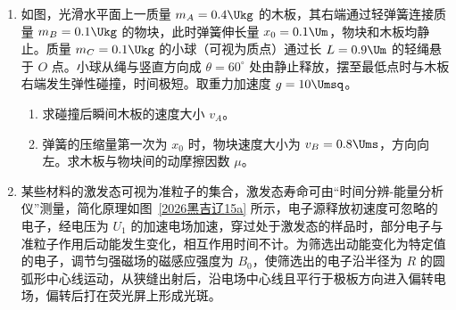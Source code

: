 \documentclass[\gkver]{gaokaozhenti}
\begin{document}
\begin{enumerate}
{（2）减速阶段，由动量定理得
\[ -\left(mg-\frac{1}{6}mg\right)t=0-mv_{m} \]
解得 $t=3\Us$。
}
\item
如图，光滑水平面上一质量 $m_{A}=0.4\Ukg$ 的木板，其右端通过轻弹簧连接质量 $m_{B}=0.1\Ukg$ 的物块，此时弹簧伸长量 $x_{0}=0.1\Um$，物块和木板均静止。质量 $m_{C}=0.1\Ukg$ 的小球（可视为质点）通过长 $L=0.9\Um$ 的轻绳悬于 $O$ 点。小球从绳与竖直方向成 $\theta=60^{\circ}$ 处由静止释放，摆至最低点时与木板右端发生弹性碰撞，时间极短。取重力加速度 $g=10\Umsq$。
\begin{enumerate}
	\item
	求碰撞后瞬间木板的速度大小 $v_{A}$。
	\item
	弹簧的压缩量第一次为 $x_{0}$ 时，物块速度大小为 $v_{B}=0.8\Ums$，方向向左。求木板与物块间的动摩擦因数 $\mu$。
\end{enumerate}
\onepicture[w=8.5cm, align=right]{}

\item
某些材料的激发态可视为准粒子的集合，激发态寿命可由“时间分辨-能量分析仪”测量，简化原理如图~\ref{2026黑吉辽15a} 所示，电子源释放初速度可忽略的电子，经电压为 $U_{1}$ 的加速电场加速，穿过处于激发态的样品时，部分电子与准粒子作用后动能发生变化，相互作用时间不计。为筛选出动能变化为特定值的电子，调节匀强磁场的磁感应强度为 $B_{0}$，使筛选出的电子沿半径为 $R$ 的圆弧形中心线运动，从狭缝出射后，沿电场中心线且平行于极板方向进入偏转电场，偏转后打在荧光屏上形成光斑。


\end{enumerate}
\end{document}
